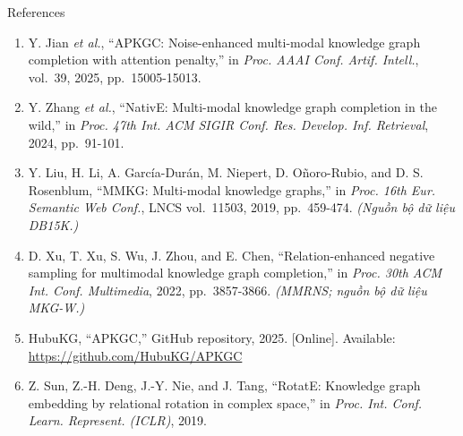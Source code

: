\documentclass[aspectratio=169,10pt]{beamer}
\begin{document}
\begin{frame}{References}
\footnotesize
\begin{enumerate}\setlength\itemsep{6pt}
  \item[{[1]}] Y. Jian \emph{et al.}, ``APKGC: Noise-enhanced multi-modal
        knowledge graph completion with attention penalty,'' in \emph{Proc.
        AAAI Conf. Artif. Intell.}, vol.~39, 2025, pp.~15005-15013.
  \item[{[2]}] Y. Zhang \emph{et al.}, ``NativE: Multi-modal knowledge graph
        completion in the wild,'' in \emph{Proc. 47th Int. ACM SIGIR Conf. Res.
        Develop. Inf. Retrieval}, 2024, pp.~91-101.
  \item[{[3]}] Y. Liu, H. Li, A. García-Durán, M. Niepert, D. Oñoro-Rubio, and
        D. S. Rosenblum, ``MMKG: Multi-modal knowledge graphs,'' in \emph{Proc.
        16th Eur. Semantic Web Conf.}, LNCS vol.~11503, 2019, pp.~459-474. \emph{(Nguồn bộ dữ liệu DB15K.)}
  \item[{[4]}] D. Xu, T. Xu, S. Wu, J. Zhou, and E. Chen, ``Relation-enhanced
        negative sampling for multimodal knowledge graph completion,'' in
        \emph{Proc. 30th ACM Int. Conf. Multimedia}, 2022, pp.~3857-3866. \emph{(MMRNS; nguồn bộ dữ liệu MKG-W.)}
  \item[{[5]}] HubuKG, ``APKGC,'' GitHub repository, 2025. [Online]. Available:
        \url{https://github.com/HubuKG/APKGC}
  \item[{[6]}] Z. Sun, Z.-H. Deng, J.-Y. Nie, and J. Tang, ``RotatE: Knowledge
        graph embedding by relational rotation in complex space,'' in
        \emph{Proc. Int. Conf. Learn. Represent. (ICLR)}, 2019.
\end{enumerate}

\end{frame}
\end{document}
